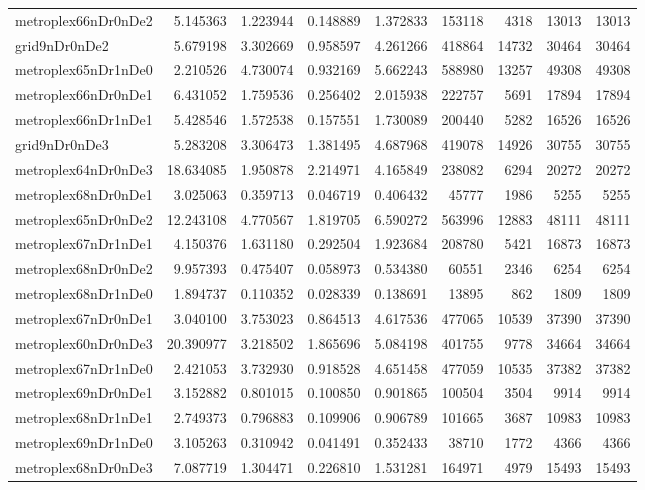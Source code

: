 \documentclass[../../../thesis.tex]{subfiles}
\begin{document}
\begin{longtable}{|l|r|r|r|r|r|r|r|r|}
metroplex66nDr0nDe2 & 5.145363 & 1.223944 & 0.148889 & 1.372833 & 153118 & 4318 & 13013 & 13013 \\
grid9nDr0nDe2 & 5.679198 & 3.302669 & 0.958597 & 4.261266 & 418864 & 14732 & 30464 & 30464 \\
metroplex65nDr1nDe0 & 2.210526 & 4.730074 & 0.932169 & 5.662243 & 588980 & 13257 & 49308 & 49308 \\
metroplex66nDr0nDe1 & 6.431052 & 1.759536 & 0.256402 & 2.015938 & 222757 & 5691 & 17894 & 17894 \\
metroplex66nDr1nDe1 & 5.428546 & 1.572538 & 0.157551 & 1.730089 & 200440 & 5282 & 16526 & 16526 \\
grid9nDr0nDe3 & 5.283208 & 3.306473 & 1.381495 & 4.687968 & 419078 & 14926 & 30755 & 30755 \\
metroplex64nDr0nDe3 & 18.634085 & 1.950878 & 2.214971 & 4.165849 & 238082 & 6294 & 20272 & 20272 \\
metroplex68nDr0nDe1 & 3.025063 & 0.359713 & 0.046719 & 0.406432 & 45777 & 1986 & 5255 & 5255 \\
metroplex65nDr0nDe2 & 12.243108 & 4.770567 & 1.819705 & 6.590272 & 563996 & 12883 & 48111 & 48111 \\
metroplex67nDr1nDe1 & 4.150376 & 1.631180 & 0.292504 & 1.923684 & 208780 & 5421 & 16873 & 16873 \\
metroplex68nDr0nDe2 & 9.957393 & 0.475407 & 0.058973 & 0.534380 & 60551 & 2346 & 6254 & 6254 \\
metroplex68nDr1nDe0 & 1.894737 & 0.110352 & 0.028339 & 0.138691 & 13895 & 862 & 1809 & 1809 \\
metroplex67nDr0nDe1 & 3.040100 & 3.753023 & 0.864513 & 4.617536 & 477065 & 10539 & 37390 & 37390 \\
metroplex60nDr0nDe3 & 20.390977 & 3.218502 & 1.865696 & 5.084198 & 401755 & 9778 & 34664 & 34664 \\
metroplex67nDr1nDe0 & 2.421053 & 3.732930 & 0.918528 & 4.651458 & 477059 & 10535 & 37382 & 37382 \\
metroplex69nDr0nDe1 & 3.152882 & 0.801015 & 0.100850 & 0.901865 & 100504 & 3504 & 9914 & 9914 \\
metroplex68nDr1nDe1 & 2.749373 & 0.796883 & 0.109906 & 0.906789 & 101665 & 3687 & 10983 & 10983 \\
metroplex69nDr1nDe0 & 3.105263 & 0.310942 & 0.041491 & 0.352433 & 38710 & 1772 & 4366 & 4366 \\
metroplex68nDr0nDe3 & 7.087719 & 1.304471 & 0.226810 & 1.531281 & 164971 & 4979 & 15493 & 15493 \\

\end{longtable}
\end{document}
